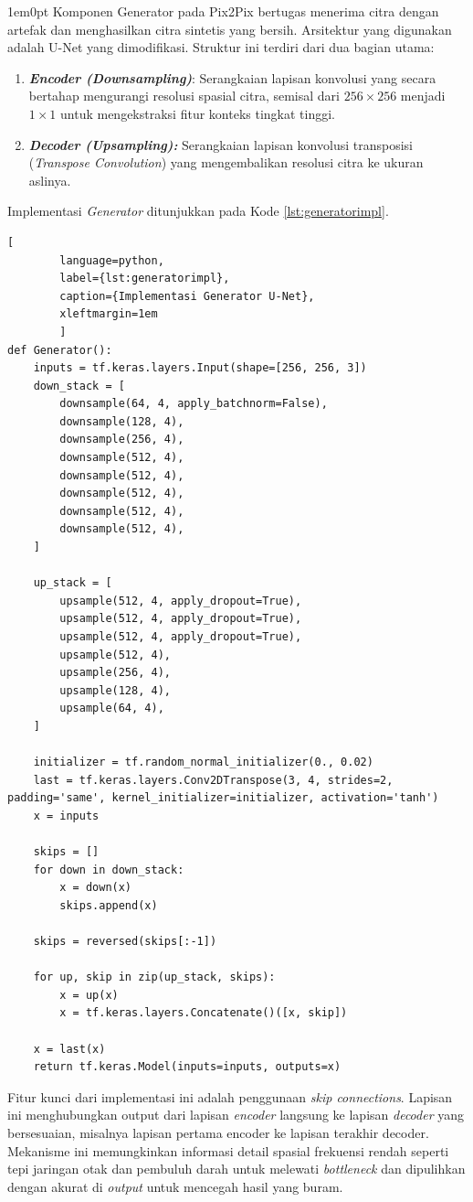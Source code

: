 \begin{adjustwidth}{1em}{0pt}
	\hspace{\parindent}Komponen Generator pada Pix2Pix bertugas menerima citra dengan artefak dan menghasilkan citra sintetis yang bersih. Arsitektur yang digunakan adalah U-Net yang dimodifikasi. Struktur ini terdiri dari dua bagian utama:
	\begin{enumerate}[nosep]
		\item \textbf{\textit{Encoder (Downsampling)}}: Serangkaian lapisan konvolusi yang secara bertahap mengurangi resolusi spasial citra, semisal dari $256 \times 256$ menjadi $1 \times 1$ untuk mengekstraksi fitur konteks tingkat tinggi.
		
		\item \textbf{\textit{Decoder (Upsampling):}} Serangkaian lapisan konvolusi transposisi (\textit{Transpose Convolution}) yang mengembalikan resolusi citra ke ukuran aslinya.
	\end{enumerate}
	
	Implementasi \textit{Generator} ditunjukkan pada Kode \ref{lst:generatorimpl}.
	
	\begin{lstlisting}[
		language=python,
		label={lst:generatorimpl},
		caption={Implementasi Generator U-Net},
		xleftmargin=1em
		]
def Generator():
	inputs = tf.keras.layers.Input(shape=[256, 256, 3])
	down_stack = [
		downsample(64, 4, apply_batchnorm=False),
		downsample(128, 4),
		downsample(256, 4),
		downsample(512, 4),
		downsample(512, 4),
		downsample(512, 4),
		downsample(512, 4),
		downsample(512, 4),
	]
	
	up_stack = [
		upsample(512, 4, apply_dropout=True),
		upsample(512, 4, apply_dropout=True),
		upsample(512, 4, apply_dropout=True),
		upsample(512, 4),
		upsample(256, 4),
		upsample(128, 4),
		upsample(64, 4),
	]
	
	initializer = tf.random_normal_initializer(0., 0.02)
	last = tf.keras.layers.Conv2DTranspose(3, 4, strides=2, padding='same', kernel_initializer=initializer, activation='tanh')
	x = inputs
	
	skips = []
	for down in down_stack:
		x = down(x)
		skips.append(x)
	
	skips = reversed(skips[:-1])
	
	for up, skip in zip(up_stack, skips):
		x = up(x)
		x = tf.keras.layers.Concatenate()([x, skip])
	
	x = last(x)
	return tf.keras.Model(inputs=inputs, outputs=x)
	\end{lstlisting}
	
	Fitur kunci dari implementasi ini adalah penggunaan \textit{skip connections}. Lapisan ini menghubungkan output dari lapisan \textit{encoder} langsung ke lapisan \textit{decoder} yang bersesuaian, misalnya lapisan pertama encoder ke lapisan terakhir decoder. Mekanisme ini memungkinkan informasi detail spasial frekuensi rendah seperti tepi jaringan otak dan pembuluh darah untuk melewati \textit{bottleneck} dan dipulihkan dengan akurat di \textit{output} untuk mencegah hasil yang buram.
\end{adjustwidth}

